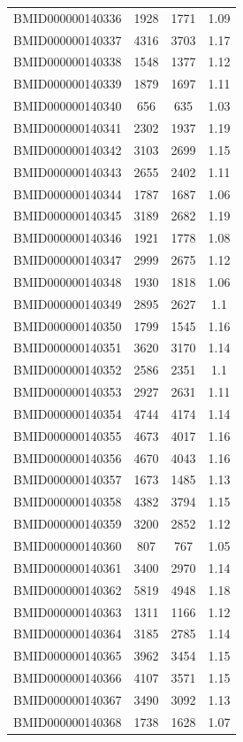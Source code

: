 \documentclass{bmcart}
\begin{document}
\begin{backmatter}
\begin{center}
\begin{longtable}{c|c|c|c}
BMID000000140336 & 1928 & 1771 & 1.09 \\
BMID000000140337 & 4316 & 3703 & 1.17 \\
BMID000000140338 & 1548 & 1377 & 1.12 \\
BMID000000140339 & 1879 & 1697 & 1.11 \\
BMID000000140340 & 656 & 635 & 1.03 \\
BMID000000140341 & 2302 & 1937 & 1.19 \\
BMID000000140342 & 3103 & 2699 & 1.15 \\
BMID000000140343 & 2655 & 2402 & 1.11 \\
BMID000000140344 & 1787 & 1687 & 1.06 \\
BMID000000140345 & 3189 & 2682 & 1.19 \\
BMID000000140346 & 1921 & 1778 & 1.08 \\
BMID000000140347 & 2999 & 2675 & 1.12 \\
BMID000000140348 & 1930 & 1818 & 1.06 \\
BMID000000140349 & 2895 & 2627 & 1.1 \\
BMID000000140350 & 1799 & 1545 & 1.16 \\
BMID000000140351 & 3620 & 3170 & 1.14 \\
BMID000000140352 & 2586 & 2351 & 1.1 \\
BMID000000140353 & 2927 & 2631 & 1.11 \\
BMID000000140354 & 4744 & 4174 & 1.14 \\
BMID000000140355 & 4673 & 4017 & 1.16 \\
BMID000000140356 & 4670 & 4043 & 1.16 \\
BMID000000140357 & 1673 & 1485 & 1.13 \\
BMID000000140358 & 4382 & 3794 & 1.15 \\
BMID000000140359 & 3200 & 2852 & 1.12 \\
BMID000000140360 & 807 & 767 & 1.05 \\
BMID000000140361 & 3400 & 2970 & 1.14 \\
BMID000000140362 & 5819 & 4948 & 1.18 \\
BMID000000140363 & 1311 & 1166 & 1.12 \\
BMID000000140364 & 3185 & 2785 & 1.14 \\
BMID000000140365 & 3962 & 3454 & 1.15 \\
BMID000000140366 & 4107 & 3571 & 1.15 \\
BMID000000140367 & 3490 & 3092 & 1.13 \\
BMID000000140368 & 1738 & 1628 & 1.07 \\

\end{longtable}
\end{center}
\end{backmatter}
\end{document}
